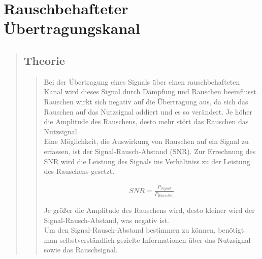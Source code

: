 \section{Rauschbehafteter Übertragungskanal}
\begin{quote}
	\subsection{Theorie}
    \begin{quote}
        Bei der Übertragung eines Signals über einen rauschbehafteten Kanal wird
        dieses Signal durch Dämpfung und Rauschen beeinflusst. Rauschen wirkt sich negativ auf die Übertragung aus, da sich das Rauschen auf das
        Nutzsignal addiert und es so verändert. Je höher die Amplitude des
        Rauschens, desto mehr stört das Rauschen das Nutzsignal.\\
        Eine Möglichkeit, die Auswirkung von Rauschen auf ein Signal zu
        erfassen, ist der Signal-Rausch-Abstand (SNR).
        Zur Errechnung des SNR wird die Leistung des Signals ins Verhältniss zu der Leistung des Rauschens gesetzt.
        
        \begin{equation*}
        	\begin{split}
        		SNR = \frac{P_{Signal}}{P_{Rauschen}}
        	\end{split}
        \end{equation*}
        
        Je größer die Amplitude des Rauschens wird, desto kleiner wird der
        Signal-Rausch-Abstand, was negativ ist.\\
        Um den Signal-Rausch-Abstand bestimmen zu können, benötigt man
        selbstverständlich gezielte Informationen über das Nutzsignal sowie das Rauschsignal. 
    \end{quote}
    

\end{quote}
